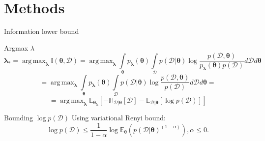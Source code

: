 \documentclass{beamer}
\DeclareMathOperator*{\argmax}{arg\,max}
\begin{document}
\section{Methods}
\begin{frame}{Information lower bound}
\centering
\begin{block}{Argmax $\lambda$}
    \[
    \boldsymbol{\lambda}_{*} = \displaystyle \argmax_{\boldsymbol{\lambda}} \mathbb{I} (\boldsymbol{\theta}, \mathcal{D})
    = \displaystyle\argmax_{\boldsymbol{\lambda}}  \int\limits_{\boldsymbol{\theta}} p_{\boldsymbol{\lambda}}(\boldsymbol{\theta}) \int\limits_{\mathcal{D}} p(\mathcal{D}|\boldsymbol{\theta}) \log \frac{p(\mathcal{D}, \boldsymbol{\theta})}{p_{\boldsymbol{\lambda}}(\boldsymbol{\theta})p(\mathcal{D})} d\mathcal{D}d\boldsymbol{\theta} \]
    \[
    = \displaystyle\argmax_{\boldsymbol{\lambda}}  \int\limits_{\boldsymbol{\theta}} p_{\boldsymbol{\lambda}}(\boldsymbol{\theta}) \int\limits_{\mathcal{D}} p(\mathcal{D}|\boldsymbol{\theta}) \log \frac{p(\mathcal{D}, \boldsymbol{\theta})}{p(\mathcal{D})} d\mathcal{D} d\boldsymbol{\theta} =\] 
    \begin{equation}
    = \displaystyle\argmax_{\boldsymbol{\lambda}} \mathbb{E}_{\boldsymbol{\theta}_{\boldsymbol{\lambda}}} [-\mathbb{H}_{\mathcal{D}|\boldsymbol{\theta}}[\mathcal{D}] - \mathbb{E}_{\mathcal{D}|\boldsymbol{\theta}}[\log p(\mathcal{D})]]
    \end{equation}
    \end{block}
    
    \begin{block}{Bounding $\log p(\mathcal{D})$}
    Using variational Renyi bound:
    \begin{equation}
        \log p(\mathcal{D}) \leq \frac{1}{1 - \alpha} \log \mathbb{E}_{\boldsymbol{\theta}}(p(\mathcal{D}|\boldsymbol{\theta})^{(1 - \alpha)}), \alpha \leq 0. 
    \end{equation}
        
    \end{block}
 
\end{frame}
\end{document}
